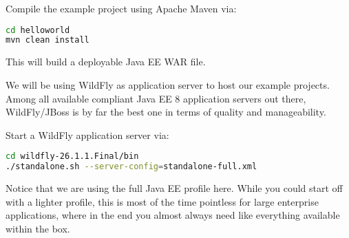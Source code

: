 Compile the example project using Apache Maven via:
\begin{lstlisting}[language=bash]
cd helloworld
mvn clean install
\end{lstlisting}
This will build a deployable Java EE WAR file.

We will be using WildFly \cite{WildFly} as application server to host our example projects.
Among all available compliant Java EE 8 application servers out there,
WildFly/JBoss is by far the best one in terms of quality and manageability.

Start a WildFly \cite{WildFly} application server via:
\begin{lstlisting}[language=bash]
cd wildfly-26.1.1.Final/bin
./standalone.sh --server-config=standalone-full.xml
\end{lstlisting}
Notice that we are using the full Java EE profile here.
While you could start off with a lighter profile, this is most of the time pointless for large enterprise applications, where in the end you almost always need like everything available within the box.
